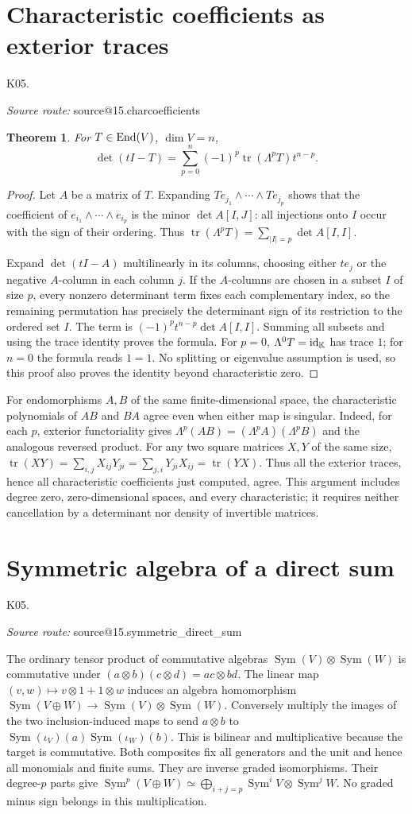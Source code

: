 \documentclass[11pt,a4paper]{book}
\makeatletter
\newtheorem{theorem}{Theorem}[chapter]
\theoremstyle{definition}\newtheorem{definition}[theorem]{Definition}
\theoremstyle{remark}\newtheorem{remark}[theorem]{Remark}
\newcommand{\K}{\mathbb K}\newcommand{\R}{\mathbb R}\newcommand{\C}{\mathbb C}
\DeclareMathOperator{\tr}{tr}\DeclareMathOperator{\Span}{span}
\DeclareMathOperator{\Sym}{Sym}\DeclareMathOperator{\Ann}{Ann}
\newcommand{\Kentry}[2]{\section{#2}\label{k:#1}\noindent\textsf{\small K05.\detokenize{#1}}\par
  \begingroup\small\color{black!65}\textit{Source route: }\csname source@#1\endcsname\par\endgroup}
\makeatother
\begin{document}
\Kentry{15.charcoefficients}{Characteristic coefficients as exterior traces}
\begin{theorem}
For $T\in\operatorname{End}(V)$, $\dim V=n$,
\[
 \det(tI-T)=\sum_{p=0}^n(-1)^p\tr(\Lambda^pT)t^{n-p}.
\]
\end{theorem}
\begin{proof}
Let $A$ be a matrix of $T$. Expanding $Te_{j_1}\wedge\cdots\wedge Te_{j_p}$ shows that the coefficient of $e_{i_1}\wedge\cdots\wedge e_{i_p}$ is the minor $\det A[I,J]$: all injections onto $I$ occur with the sign of their ordering. Thus $\tr(\Lambda^pT)=\sum_{|I|=p}\det A[I,I]$.

Expand $\det(tI-A)$ multilinearly in its columns, choosing either $te_j$ or the negative $A$-column in each column $j$. If the $A$-columns are chosen in a subset $I$ of size $p$, every nonzero determinant term fixes each complementary index, so the remaining permutation has precisely the determinant sign of its restriction to the ordered set $I$. The term is $(-1)^pt^{n-p}\det A[I,I]$. Summing all subsets and using the trace identity proves the formula. For $p=0$, $\Lambda^0T=\id_\K$ has trace $1$; for $n=0$ the formula reads $1=1$. No splitting or eigenvalue assumption is used, so this proof also proves the identity beyond characteristic zero.
\end{proof}

For endomorphisms $A,B$ of the same finite-dimensional space, the characteristic polynomials of $AB$ and $BA$ agree even when either map is singular. Indeed, for each $p$, exterior functoriality gives $\Lambda^p(AB)=(\Lambda^pA)(\Lambda^pB)$ and the analogous reversed product. For any two square matrices $X,Y$ of the same size, $\tr(XY)=\sum_{i,j}X_{ij}Y_{ji}=\sum_{j,i}Y_{ji}X_{ij}=\tr(YX)$. Thus all the exterior traces, hence all characteristic coefficients just computed, agree. This argument includes degree zero, zero-dimensional spaces, and every characteristic; it requires neither cancellation by a determinant nor density of invertible matrices.

\Kentry{15.symmetric_direct_sum}{Symmetric algebra of a direct sum}
The ordinary tensor product of commutative algebras $\Sym(V)\otimes\Sym(W)$ is commutative under $(a\otimes b)(c\otimes d)=ac\otimes bd$. The linear map $(v,w)\mapsto v\otimes1+1\otimes w$ induces an algebra homomorphism $\Sym(V\oplus W)\to\Sym(V)\otimes\Sym(W)$. Conversely multiply the images of the two inclusion-induced maps to send $a\otimes b$ to $\Sym(\iota_V)(a)\Sym(\iota_W)(b)$. This is bilinear and multiplicative because the target is commutative. Both composites fix all generators and the unit and hence all monomials and finite sums. They are inverse graded isomorphisms. Their degree-$p$ parts give $\Sym^p(V\oplus W)\simeq\bigoplus_{i+j=p}\Sym^iV\otimes\Sym^jW$. No graded minus sign belongs in this multiplication.
\end{document}
